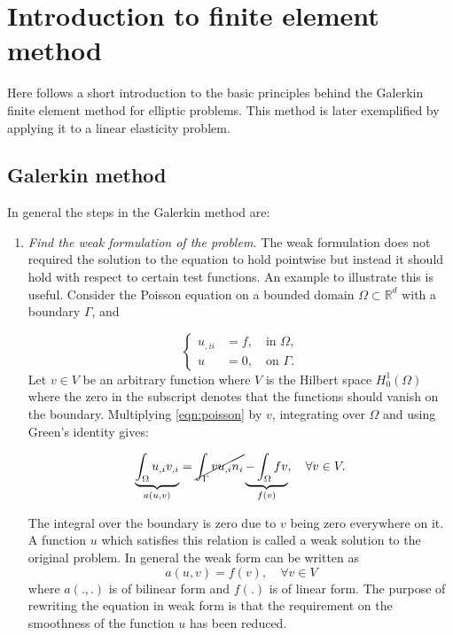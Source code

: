 \documentclass[fem.tex]{subfiles}
\begin{document}
\chapter{Introduction to finite element method}

Here follows a short introduction to the basic principles behind the Galerkin finite element method for elliptic problems.  This method is later exemplified by applying it to a linear elasticity problem.

\section{Galerkin method}
\label{sec:galerkin}

In general the steps in the Galerkin method are:
\begin{enumerate}
\item \emph{Find the weak formulation of the problem.} The weak formulation does not required the solution to the equation to hold pointwise but instead it should hold with respect to certain test functions. An example to illustrate this is useful. Consider the Poisson equation on a bounded domain $\Omega \subset \mathbb{R}^d$ with a boundary $\Gamma$, and


\begin{equation}
\label{eqn:poisson}
\left\{ \begin{array}{ll}
u_{,ii} & = f, \quad \text{in } \Omega, \\
u & = 0, \quad  \text{on } \Gamma. \end{array} \right.
\end{equation}
Let $v \in V$ be an arbitrary function where $V$ is the Hilbert space $H_0^1(\Omega)$ where the zero in the subscript denotes that the functions should vanish on the boundary. Multiplying \ref{eqn:poisson} by $v$, integrating over $\Omega$ and using Green's identity gives:

\begin{align}
\underbrace{\int_\Omega u_{,i} v_{,i}}_{a(u,v)} = \cancel{\int_\Gamma v u_{,i} n_i } \underbrace{- \int_\Omega fv}_{f(v)}, \quad \forall v \in V.
\end{align}

The integral over the boundary is zero due to $v$ being zero everywhere on it. A function $u$ which satisfies this relation is called a weak solution to the original problem. In general the weak form can be written as
\begin{equation}
\label{eqn_weak}
    a(u,v) = f(v), \quad \forall v \in V
\end{equation}
where $a(.,.)$ is of bilinear form and $f(.)$ is of linear form. The purpose of rewriting the equation in weak form is that the requirement on the smoothness of the function $u$ has been reduced. 


\end{enumerate}
\end{document}
